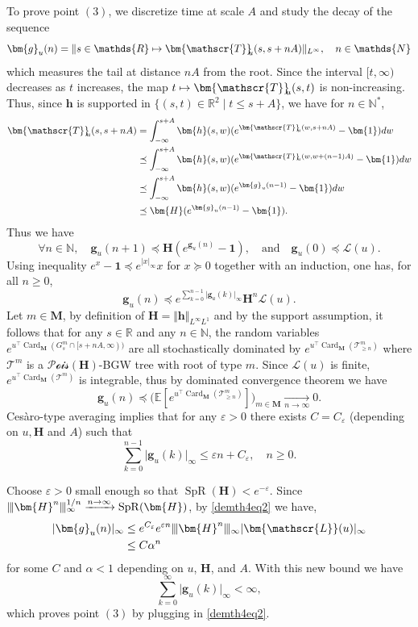 \documentclass[reqno,final,11pt]{amsart}
\theoremstyle{plain}
\theoremstyle{definition}
\theoremstyle{remark}
\newcommand{\R}{\mathds{R}}
\newcommand{\N}{\mathds{N}}
\newcommand{\E}[1]{\mathds{E}\left[#1\right]}
\newcommand{\itg}{\displaystyle\int}
\newcommand{\M}{\bm{M}}
\newcommand{\T}{\mathcal{T}}
\renewcommand{\L}{\bm{\mathscr{L}}}
\newcommand{\ones}{\bm{1}}
\newcommand{\h}{\bm{h}}
\newcommand{\bTa}[1]{\bm{\mathscr{T}}_{\mkern-7mu #1}}
\newcommand{\g}{\bm{g}}
\renewcommand{\H}{\bm{H}}
\newcommand{\Vity}[1]{\Vert #1 \Vert_{L^{\infty}}}
\newcommand{\Vityone}[1]{\Vert #1 \Vert_{L^{\infty}L^{1}}}
\newcommand{\Pois}{\mathscr{P}\!\mathscr{o}\!\mathscr{i}\!\mathscr{s}}
\newcommand{\Vvert}{\vert \hspace{-1pt} \vert \hspace{-1pt} \vert}
\newcommand{\trp}{^{\intercal}}
\DeclareMathOperator{\card}{Card}
\DeclareMathOperator{\spr}{SpR}
\begin{document}
    To prove point $(3)$, we discretize time at scale $A$ and study the decay of the sequence
\[\g_u(n)=\Vity{s\in\R \mapsto \bTa{u}(s,s+nA)}, \quad n\in\N\]
which measures the tail at distance $nA$ from the root. Since the interval $[t,\infty)$ decreases as $t$ increases, the map $t\mapsto \bTa{u}(s,t)$ is non-increasing. Thus, since $\h$ is supported in $\{(s,t)\in\R^2 \mid t\leq s+A\}$, we have for $n\in\N^*$,
\begin{align*}
	\bTa{u}(s,s+nA) & =  \itg_{-\infty}^{s+A} \h(s,w) (e^{\bTa{u}(w,s+nA)}-\ones)dw\\
	& \preceq  \itg_{-\infty}^{s+A} \h(s,w) (e^{\bTa{u}(w,w+(n-1)A)}-\ones)dw\\
	& \preceq  \itg_{-\infty}^{s+A} \h(s,w) (e^{\g_u(n-1)}-\ones) dw \\
	& \preceq  \H (e^{\g_u(n-1)}-\ones).
\end{align*}
Thus we have
\[\forall n\in\N, \quad \g_u(n+1) \preceq \H(e^{\g_u(n)}-\ones), \quad   \text{and} \quad \g_u(0)\preceq \L(u).\]
Using inequality $e^x-\ones \preceq e^{\vert x\vert_{\infty}} x$ for $x\succeq 0$ together with an induction, one has, for all $n\geq 0$,
\begin{equation}\label{demth4eq2}
    \g_{u}(n) \preceq e^{\sum_{k=0}^{n-1}\vert \g_{u}(k)\vert_{\infty}} \H^n \L(u).
\end{equation}
Let $m\in\M$, by definition of $\H = \Vityone{\h}$ and by the support assumption, it follows that for any $s\in\R$ and any $n\in\N$, the random variables $e^{u\trp \card_{\M}(G_s^m\cap[s+nA,\infty))}$ are all stochastically dominated by $e^{u\trp \card_{\M}(\T^m_{\geq n})}$ where $\T^m$ is a $\Pois(\H)$-BGW tree with root of type $m$. Since $\L(u)$ is finite, $e^{u\trp \card_{\M}(\T^m)}$ is integrable, thus by dominated convergence theorem we have
\begin{equation*}
	\g_u(n) \preceq \Big(\E{e^{u\trp \card_{\M}(\T^m_{\geq n})}}\Big)_{m\in\M} \xrightarrow[n\to\infty]{} 0.
\end{equation*}
Cesàro-type averaging implies that for any $\varepsilon >0$ there exists $C=C_{\varepsilon}$ (depending on $u,\H$ and $A$) such that
\begin{equation*}
	\sum_{k=0}^{n-1}\vert \g_{u}(k)\vert_{\infty} \leq \varepsilon n + C_{\varepsilon}, \quad n\geq 0.
\end{equation*}

Choose $\varepsilon>0$ small enough so that $\spr(\H)< e^{-\varepsilon}$. Since $\Vvert \H^n \Vvert_{\infty}^{1/n} \xrightarrow[]{n\to\infty} \spr(\H)$, by \eqref{demth4eq2} we have,
\begin{align*}
	\vert \g_{u}(n)\vert_{\infty} & \leq e^{C_{\varepsilon}} e^{\varepsilon n} \Vvert \H^n\Vvert_{\infty} \vert \L(u)\vert_{\infty} \\
	& \leq C \alpha^n
\end{align*}
for some $C$ and $\alpha<1$ depending on $u$, $\H$, and $A$. With this new bound we have
\begin{equation*}
	\sum_{k=0}^{\infty}\vert \g_{u}(k)\vert_{\infty} <\infty,
\end{equation*}
which proves point $(3)$ by plugging in \eqref{demth4eq2}.
\end{document}
